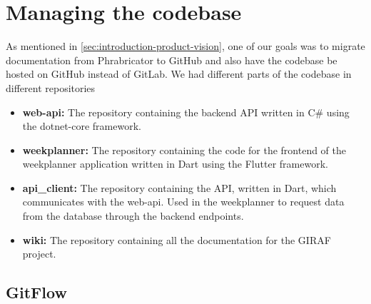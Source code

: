\section{Managing the codebase}
As mentioned in \autoref{sec:introduction-product-vision}, one of our goals was to migrate documentation from Phrabricator to GitHub and also have the codebase be hosted on GitHub instead of GitLab. We had different parts of the codebase in different repositories

\begin{itemize}
    \item \textbf{web-api:} The repository containing the backend API written in C\# using the dotnet-core framework.
    \item \textbf{weekplanner:} The repository containing the code for the frontend of the weekplanner application written in Dart using the Flutter framework. 
    \item \textbf{api_client:} The repository containing the API, written in Dart, which communicates with the web-api. Used in the weekplanner to request data from the database through the backend endpoints.
    \item \textbf{wiki:} The repository containing all the documentation for the GIRAF project. 
\end{itemize}

\subsection{GitFlow}